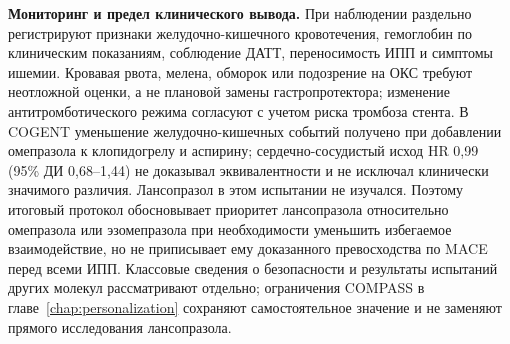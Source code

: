 \documentclass[11pt,a4paper,notitlepage]{report}
\newcommand{\src}[1]{\unskip\space\cite{#1}}
\begin{document}
\textbf{Мониторинг и предел клинического вывода.} При наблюдении раздельно регистрируют признаки желудочно-кишечного кровотечения, гемоглобин по клиническим показаниям, соблюдение ДАТТ, переносимость ИПП и симптомы ишемии. Кровавая рвота, мелена, обморок или подозрение на ОКС требуют неотложной оценки, а не плановой замены гастропротектора; изменение антитромботического режима согласуют с учетом риска тромбоза стента.\src{cardioesc2023,cardioacc2025} В COGENT уменьшение желудочно-кишечных событий получено при добавлении омепразола к клопидогрелу и аспирину; сердечно-сосудистый исход HR 0,99 (95\% ДИ 0,68--1,44) не доказывал эквивалентности и не исключал клинически значимого различия. Лансопразол в этом испытании не изучался.\src{cardiocogent2010} Поэтому итоговый протокол обосновывает приоритет лансопразола относительно омепразола или эзомепразола при необходимости уменьшить избегаемое взаимодействие, но не приписывает ему доказанного превосходства по MACE перед всеми ИПП. Классовые сведения о безопасности и результаты испытаний других молекул рассматривают отдельно; ограничения COMPASS в главе~\ref{chap:personalization} сохраняют самостоятельное значение и не заменяют прямого исследования лансопразола.\src{cardioesc2024,cardioplavix2025,compass}
\end{document}
